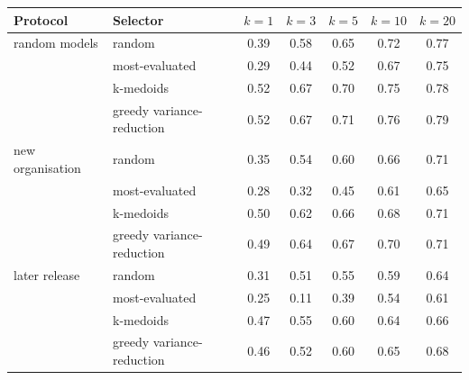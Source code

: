 \begin{tabular}{llccccc}\toprule
Protocol & Selector & $k{=}1$ & $k{=}3$ & $k{=}5$ & $k{=}10$ & $k{=}20$ \\\midrule
random models & random & 0.39 & 0.58 & 0.65 & 0.72 & 0.77 \\
 & most-evaluated & 0.29 & 0.44 & 0.52 & 0.67 & 0.75 \\
 & k-medoids & 0.52 & 0.67 & 0.70 & 0.75 & 0.78 \\
 & greedy variance-reduction & 0.52 & 0.67 & 0.71 & 0.76 & 0.79 \\
\midrule
new organisation & random & 0.35 & 0.54 & 0.60 & 0.66 & 0.71 \\
 & most-evaluated & 0.28 & 0.32 & 0.45 & 0.61 & 0.65 \\
 & k-medoids & 0.50 & 0.62 & 0.66 & 0.68 & 0.71 \\
 & greedy variance-reduction & 0.49 & 0.64 & 0.67 & 0.70 & 0.71 \\
\midrule
later release & random & 0.31 & 0.51 & 0.55 & 0.59 & 0.64 \\
 & most-evaluated & 0.25 & 0.11 & 0.39 & 0.54 & 0.61 \\
 & k-medoids & 0.47 & 0.55 & 0.60 & 0.64 & 0.66 \\
 & greedy variance-reduction & 0.46 & 0.52 & 0.60 & 0.65 & 0.68 \\
\bottomrule
\end{tabular}
